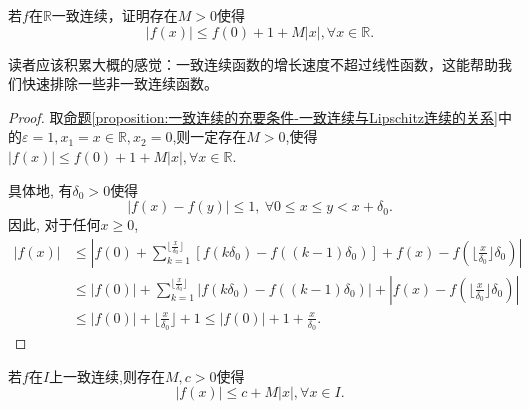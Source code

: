 \documentclass[../../main.tex]{subfiles}%
\begin{document}
\begin{corollary}[一致连续函数被线性函数控制]\label{corollary:一致连续函数被线性函数控制}
若\(f\)在\(\mathbb{R}\)一致连续，证明存在\(M>0\)使得
\[
|f(x)|\leqslant f(0) + 1 + M|x|,\forall x\in\mathbb{R}.
\]
\end{corollary}
\begin{note}
读者应该积累大概的感觉：一致连续函数的增长速度不超过线性函数，这能帮助我们快速排除一些非一致连续函数。
\end{note}
\begin{proof}
取\hyperref[proposition:一致连续的充要条件-一致连续与Lipschitz连续的关系]{命题\ref{proposition:一致连续的充要条件-一致连续与Lipschitz连续的关系}}中的$\varepsilon=1,x_1=x\in \mathbb{R},x_2=0$,则一定存在$M>0$,使得\(
|f(x)|\leqslant f(0) + 1 + M|x|,\forall x\in\mathbb{R}\).

具体地, 有$\delta_0 > 0$使得
\[
| f(x) - f(y) |\leqslant 1,\ \forall 0 \leqslant x \leqslant y < x + \delta_0.
\]
因此, 对于任何$x \geqslant 0$,
\begin{align*}
|f(x)|&\leqslant \left| f\left( 0 \right) +\sum_{k=1}^{\lfloor \frac{x}{\delta _0} \rfloor}{\left[ f\left( k\delta _0 \right) -f\left( \left( k-1 \right) \delta _0 \right) \right]}+f\left( x \right) -f\left( \lfloor \frac{x}{\delta _0} \rfloor \delta _0 \right) \right|
\\
&\leqslant |f(0)|+\sum_{k=1}^{\lfloor \frac{x}{\delta _0} \rfloor}{\left| f\left( k\delta _0 \right) -f\left( \left( k-1 \right) \delta _0 \right) \right|}+\left| f\left( x \right) -f\left( \lfloor \frac{x}{\delta _0} \rfloor \delta _0 \right) \right|
\\
&\leqslant |f(0)|+\lfloor \frac{x}{\delta _0} \rfloor +1\leqslant |f(0)|+1+\frac{x}{\delta _0}.
\end{align*}
\end{proof}

\begin{corollary}\label{corollary:一致连续函数被线性函数控制1}
若\(f\)在$I$上一致连续,则存在\(M,c>0\)使得
\[
|f(x)|\leqslant c + M|x|,\forall x\in I.
\]
\end{corollary}
\end{document}
